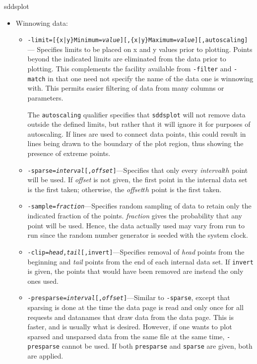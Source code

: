 \begin{sddsprog}{sddsplot}
\begin{itemize}
\begin{itemize}
  \end{itemize}
\item Winnowing data:
  \begin{itemize}
  \item {\tt -limit=[\{x|y\}Minimum={\em value}][,\{x|y\}Maximum={\em value}][,autoscaling]}---
Specifies limits to be placed on x and y values prior to plotting.  Points beyond the indicated limits are 
eliminated from the data prior to plotting.  This complements the facility available from {\tt -filter} and
{\tt -match} in that one need not specify the name of the data one is winnowing with.  This permits easier
filtering of data from many columns or parameters.

The {\tt autoscaling} qualifier specifies that \verb|sddsplot| will not remove data outside the
defined limits, but rather that it will ignore it for purposes of autoscaling.  If lines are used to
connect data points, this could result in lines being drawn to the boundary of the plot region, thus
showing the presence of extreme points.

  \item {\tt -sparse={\em interval}[,{\em offset}]}---Specifies that only every {\em interval}${
{th}}$ point will be used.  If {\em offset} is not given, the first point in the internal data set is
the first taken; otherwise, the {\em offset}${ {th}}$ point is the first taken.

  \item {\tt -sample={\em fraction}}---Specifies random sampling of data to retain only the indicated
fraction of the points.  {\em fraction} gives the probability that any point will be used.  Hence,
the data actually used may vary from run to run since the random number generator is seeded with the
system clock.

  \item {\tt -clip={\em head},{\em tail}[,invert]}---Specifies removal of {\em head} points from the
beginning and {\em tail} points from the end of each internal data set.  If {\tt invert} is given,
the points that would have been removed are instead the only ones used.

  \item {\tt -presparse={\em interval}[,{\em offset}]}---Similar to {\tt -sparse}, except that
sparsing is done at the time the data page is read and only once for all requests and
datanames that draw data from the data page.  This is faster, and is usually what is desired.
However, if one wants to plot sparsed and unsparsed data from the same file at the same time,
{\tt -presparse} cannot be used.  If both {\tt presparse} and {\tt sparse} are given, both
are applied.


\end{itemize}
\end{itemize}
\end{sddsprog}
